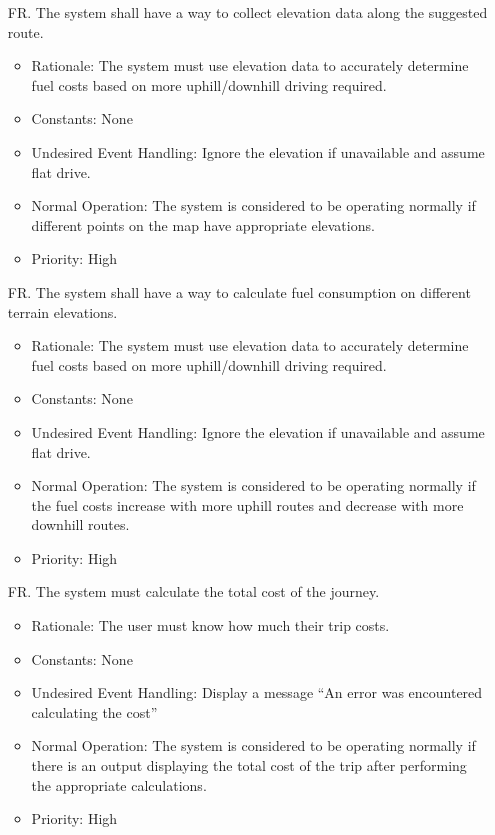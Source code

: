 \documentclass[12pt]{article}
\newcounter{reqnum} %
\begin{document}
\begin{itemize}
\item[FR\refstepcounter{reqnum}\thereqnum. ] The system shall have a way to collect elevation data along the suggested route.
\begin{itemize}
    \item Rationale: The system must use elevation data to accurately determine fuel costs based on more uphill/downhill driving required.
    \item Constants: None
    \item Undesired Event Handling: Ignore the elevation if unavailable and assume flat drive.
    \item Normal Operation: The system is considered to be operating normally if different points on the map have appropriate elevations.
	\item Priority: High
\end{itemize}

\item[FR\refstepcounter{reqnum}\thereqnum. ] The system shall have a way to calculate fuel consumption on different terrain elevations.
\begin{itemize}
    \item Rationale: The system must use elevation data to accurately determine fuel costs based on more uphill/downhill driving required.
    \item Constants: None
    \item Undesired Event Handling: Ignore the elevation if unavailable and assume flat drive.
    \item Normal Operation: The system is considered to be operating normally if the fuel costs increase with more uphill routes and decrease with more downhill routes.
	\item Priority: High
\end{itemize}

\item[FR\refstepcounter{reqnum}\thereqnum. ] The system must calculate the total cost of the journey.
\begin{itemize}
    \item Rationale: The user must know how much their trip costs.
    \item Constants: None
    \item Undesired Event Handling: Display a message “An error was encountered calculating the cost”
    \item Normal Operation: The system is considered to be operating normally if there is an output displaying the total cost of the trip after performing the appropriate calculations.
	\item Priority: High
\end{itemize}


\end{itemize}
\end{document}
